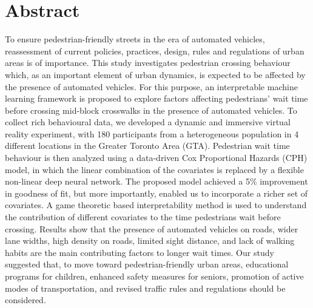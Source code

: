 \section*{Abstract}
To ensure pedestrian-friendly streets in the era of automated vehicles, reassessment of current policies, practices, design, rules and regulations of urban areas is of importance. This study investigates pedestrian crossing behaviour which, as an important element of urban dynamics,
 is expected to be affected by the presence of automated vehicles. For this purpose, an interpretable machine learning framework is proposed to explore factors affecting pedestrians' wait time before crossing mid-block crosswalks in the presence of automated vehicles.
To collect rich behavioural data, we developed a dynamic and immersive virtual reality experiment, with 180 participants from a heterogeneous population in 4 different locations in the Greater Toronto Area (GTA). 
Pedestrian wait time behaviour is then analyzed using a data-driven Cox Proportional Hazards (CPH) model, in which the linear combination of the covariates is replaced by a flexible non-linear deep neural network.
The proposed model achieved a 5\% improvement in goodness of fit, but more importantly, enabled us to incorporate a richer set of covariates.
A game theoretic based interpretability method is used to understand the contribution of different covariates to the time pedestrians wait before crossing.
Results show that the presence of automated vehicles on roads, wider lane widths, high density on roads, limited sight distance, and lack of walking habits are the main contributing factors to longer wait times. Our study suggested that, to move toward pedestrian-friendly urban areas, educational programs for children, enhanced safety measures for seniors, promotion of active modes of transportation, and revised traffic rules and regulations should be considered.
\clearpage














